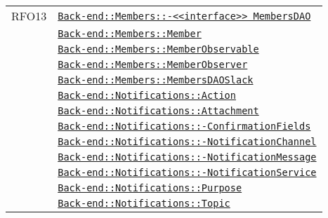 \begin{longtable}{|>{\centering}m{3cm}|m{10cm}<{\centering}|}
RFO13 & \hyperref[Back-end::Members::<<interface>> MembersDAO]{\texttt{Back-end::Members::-\linebreak <<interface>> MembersDAO}}\\
& \hyperref[Back-end::Members::Member]{\texttt{Back-end::Members::Member}}\\
& \hyperref[Back-end::Members::MemberObservable]{\texttt{Back-end::Members::MemberObservable}}\\
& \hyperref[Back-end::Members::MemberObserver]{\texttt{Back-end::Members::MemberObserver}}\\
& \hyperref[Back-end::Members::MembersDAOSlack]{\texttt{Back-end::Members::MembersDAOSlack}}\\
& \hyperref[Back-end::Notifications::Action]{\texttt{Back-end::Notifications::Action}}\\
& \hyperref[Back-end::Notifications::Attachment]{\texttt{Back-end::Notifications::Attachment}}\\
& \hyperref[Back-end::Notifications::ConfirmationFields]{\texttt{Back-end::Notifications::-\linebreak ConfirmationFields}}\\
& \hyperref[Back-end::Notifications::NotificationChannel]{\texttt{Back-end::Notifications::-\linebreak NotificationChannel}}\\
& \hyperref[Back-end::Notifications::NotificationMessage]{\texttt{Back-end::Notifications::-\linebreak NotificationMessage}}\\
& \hyperref[Back-end::Notifications::NotificationService]{\texttt{Back-end::Notifications::-\linebreak NotificationService}}\\
& \hyperref[Back-end::Notifications::Purpose]{\texttt{Back-end::Notifications::Purpose}}\\
& \hyperref[Back-end::Notifications::Topic]{\texttt{Back-end::Notifications::Topic}}\\ \hline


\end{longtable}
